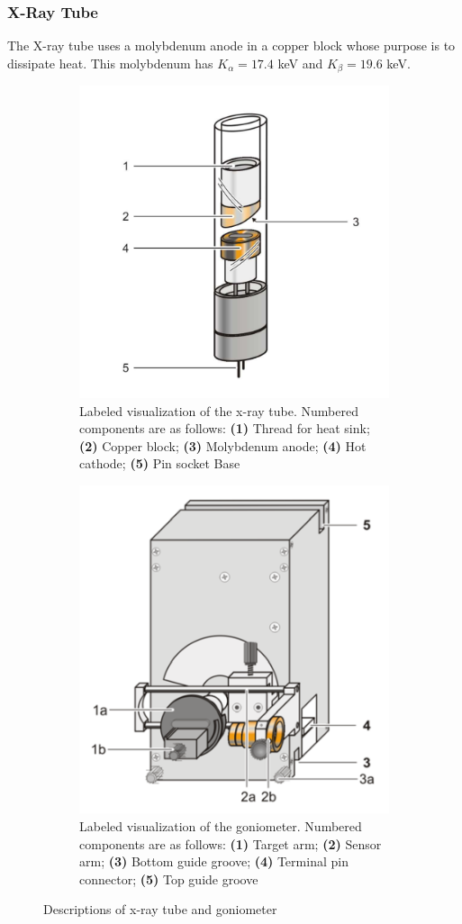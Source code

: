 \documentclass[]{article}
\newcommand{\bd}{\textbf}
\begin{document}
		\subsubsection*{X-Ray Tube}
			The X-ray tube uses a molybdenum anode in a copper block whose purpose is to dissipate heat. This molybdenum has $K_\alpha = 17.4$ keV and $K_\beta = 19.6$ keV.
			\begin{figure}[h!]
				\begin{subfigure}{.45\textwidth}
					\begin{center}
						\includegraphics[width = .5\textwidth]{x-ray tube}
					\end{center}
					\caption{Labeled visualization of the x-ray tube. Numbered components are as follows: \bd{(1)} Thread for heat sink; \bd{(2)} Copper block; \bd{(3)} Molybdenum anode; \bd{(4)} Hot cathode; \bd{(5)} Pin socket Base }
					\label{x-ray tube}
				\end{subfigure}
				\hspace{.05\textwidth}
				\begin{subfigure}{.45\textwidth}
					\begin{center}
						\includegraphics[width = .5\textwidth]{goniometer}
					\end{center}
					\caption{Labeled visualization of the goniometer. Numbered components are as follows: \bd{(1)} Target arm; \bd{(2)} Sensor arm; \bd{(3)} Bottom guide groove; \bd{(4)} Terminal pin connector; \bd{(5)} Top guide groove }
					\label{goniometer}
				\end{subfigure}
				\caption{Descriptions of x-ray tube and goniometer}
			\end{figure}
\end{document}
